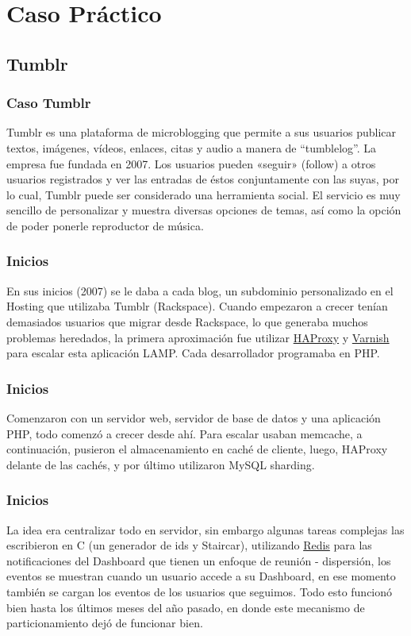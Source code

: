 \documentclass[12pt]{beamer}
\begin{document}
\section{Caso Práctico}

\subsection{Tumblr}

\begin{frame}
 \frametitle{Caso Tumblr}
 Tumblr es una plataforma de microblogging que permite a sus usuarios publicar textos, imágenes, vídeos, enlaces, citas y audio a manera de ``tumblelog''. La empresa fue fundada en 2007. Los usuarios pueden «seguir» (follow) a otros usuarios registrados y ver las entradas de éstos conjuntamente con las suyas, por lo cual, Tumblr puede ser considerado una herramienta social. El servicio es muy sencillo de personalizar y muestra diversas opciones de temas, así como la opción de poder ponerle reproductor de música.
\end{frame}


\begin{frame}
 \frametitle{Inicios}
 En sus inicios (2007) se le daba a cada blog, un subdominio personalizado en el Hosting que utilizaba Tumblr (Rackspace). Cuando empezaron a crecer tenían demasiados usuarios que migrar desde Rackspace, lo que generaba muchos problemas heredados, la primera aproximación fue utilizar \href{http://haproxy.1wt.eu/}{HAProxy} y \href{https://www.varnish-cache.org/}{Varnish} para escalar esta aplicación LAMP.
 \newline
 Cada desarrollador programaba en PHP.
\end{frame}


\begin{frame}
 \frametitle{Inicios}
 Comenzaron con un servidor web, servidor de base de datos y una aplicación PHP, todo comenzó a crecer desde ahí. Para escalar usaban memcache, a continuación, pusieron el almacenamiento en caché de cliente, luego, HAProxy delante de las cachés, y por último utilizaron MySQL sharding. 
\end{frame}

\begin{frame}
 \frametitle{Inicios}
 La idea era centralizar todo en servidor, sin embargo algunas tareas complejas las escribieron en C (un generador de ids y Staircar), utilizando \href{http://redis.io/}{Redis} para las notificaciones del Dashboard que tienen un enfoque de reunión - dispersión, los eventos se muestran cuando un usuario accede a su Dashboard, en ese momento también se cargan los eventos de los usuarios que seguimos. 
 \newline
 Todo esto funcionó bien hasta los últimos meses del año pasado, en donde este mecanismo de particionamiento dejó de funcionar bien.
\end{frame}
\end{document}
